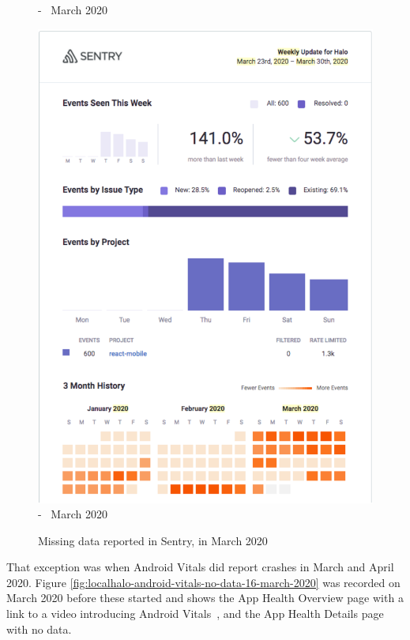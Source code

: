 \begin{figure}[htbp!]
\begin{minipage}{.49\linewidth}
  {\footnotesize {} -~ March 2020}
  \label{fig:localhalo-sentry-weekly-report-16-mar-2020}
\end{minipage}\hfill%
\begin{minipage}{.49\linewidth}%
  \centering
  \includegraphics[width=\textwidth]{images/localhalo/sentry-weekly-report-23-mar-2020.pdf}
  {\footnotesize {} -~ March 2020}
  \label{fig:localhalo-sentry-weekly-report-23-mar-2020}
\end{minipage}%
    \caption{Missing data reported in Sentry, in March 2020}
    \label{fig:sentry-missing-data-march-2020}
\end{figure}

That exception was when Android Vitals did report crashes in March and April 2020. Figure \ref{fig:localhalo-android-vitals-no-data-16-march-2020} was recorded on  March 2020 before these started and shows the App Health Overview page with a link to a video introducing Android Vitals~, and the App Health Details page with no data.

